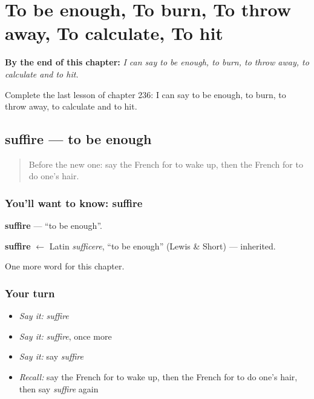 
\chapter{To be enough, To burn, To throw away, To calculate, To hit}
\label{ch:fr-to-be-enough-to-burn-to-throw-away-to-calculate-to-hit}

\begin{chapteropening}
\textbf{By the end of this chapter:} \emph{I can say to be enough, to burn, to throw away, to calculate and to hit.}

Complete the last lesson of chapter 236: I can say to be enough, to burn, to throw away, to calculate and to hit.
\end{chapteropening}

\section[suffire]{suffire — to be enough}

\label{lesson:FR-C236-suffire}



\begin{quote}
Before the new one: say the French for to wake up, then the French for to do one's hair.
\end{quote}

\subsection*{You'll want to know: suffire}
\textbf{suffire} — \textquotedblleft{}to be enough\textquotedblright{}.

\begin{cousinweb}
\textbf{suffire} $\leftarrow$ Latin \emph{sufficere}, \textquotedblleft{}to be enough\textquotedblright{} (Lewis \& Short) — inherited.
\end{cousinweb}

\begin{grammarlens}[title={What you've built}]
One more word for this chapter.
\end{grammarlens}

\subsection*{Your turn}
\begin{itemize}
\raggedright
  \item \emph{Say it:} \emph{suffire}
  \item \emph{Say it:} \emph{suffire}, once more
  \item \emph{Say it:} say \emph{suffire}
  \item \emph{Recall:} say the French for to wake up, then the French for to do one's hair, then say \emph{suffire} again
\end{itemize}

